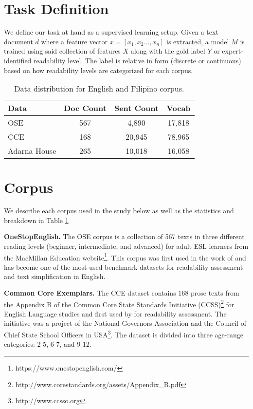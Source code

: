 \documentclass[11pt,a4paper]{article}
\begin{document}
\section{Task Definition}
We define our task at hand as a supervised learning setup. Given a text document $d$ where a feature vector $x = [x_{1},x_{2}\ldots,x_{n}]$ is extracted, a model $M$ is trained using said collection of features $X$ along with the gold label $Y$ or expert-identified readability level. The label is relative in form (discrete or continuous) based on how readability levels are categorized for each corpus.




\begin{table}[!htbp]\small
\centering
\begin{tabular}{|l|c|c|c|}

\hline \bf Data & \bf Doc Count & \bf Sent Count &\bf  Vocab\\  \hline

OSE & 567 & 4,890 & 17,818\\ \hline
CCE & 168 & 20,945 & 78,965\\ \hline
Adarna House & 265 & 10,018 & 16,058\\ \hline

\end{tabular}
\caption{\label{tab:data}
Data distribution for English and Filipino corpus.}
\end{table}


\section{Corpus}
We describe each corpus used in the study below as well as the statistics and breakdown in Table \ref{tab:data}\linebreak


\noindent\textbf{OneStopEnglish.} The OSE corpus is a collection of 567 texts in three different reading levels (beginner, intermediate, and advanced) for adult ESL learners from the MacMillan Education website\footnote{https://www.onestopenglish.com/}. This corpus was first used in the work of \citet{vajjala-lucic-2018-onestopenglish} and has become one of the most-used benchmark datasets for readability assessment and text simplification in English.\linebreak


\noindent\textbf{Common Core Exemplars.} The CCE dataset contains 168 prose texts from the Appendix B of the Common Core State Standards Initiative (CCSS)\footnote{http://www.corestandards.org/assets/Appendix\_B.pdf} for English Language studies and first used by \citet{flor-etal-2013-lexical} for readability assessment. The initiative was a project of the National Governors Association and the Council of Chief State School Officers in USA\footnote{http://www.ccsso.org}. The dataset is divided into three age-range categories: 2-5, 6-7, and 9-12. \linebreak
\end{document}

